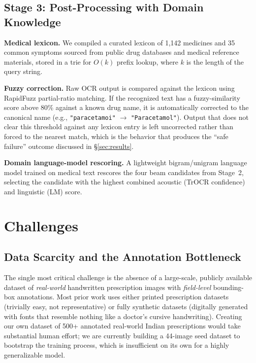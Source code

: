 \documentclass[conference]{IEEEtran}
\begin{document}
\subsection{Stage 3: Post-Processing with Domain Knowledge}
\label{sec:stage3}

\textbf{Medical lexicon.} We compiled a curated lexicon of 1{,}142 medicines and 35 common symptoms sourced from public drug databases and medical reference materials, stored in a trie for $O(k)$ prefix lookup, where $k$ is the length of the query string.

\textbf{Fuzzy correction.} Raw OCR output is compared against the lexicon using RapidFuzz partial-ratio matching. If the recognized text has a fuzzy-similarity score above 80\% against a known drug name, it is automatically corrected to the canonical name (e.g., \texttt{"paracetamoi"} $\to$ \texttt{"Paracetamol"}). Output that does not clear this threshold against any lexicon entry is left uncorrected rather than forced to the nearest match, which is the behavior that produces the ``safe failure'' outcome discussed in \S\ref{sec:results}.

\textbf{Domain language-model rescoring.} A lightweight bigram/unigram language model trained on medical text rescores the four beam candidates from Stage~2, selecting the candidate with the highest combined acoustic (TrOCR confidence) and linguistic (LM) score.

\section{Challenges}
\label{sec:challenges}

\subsection{Data Scarcity and the Annotation Bottleneck}

The single most critical challenge is the absence of a large-scale, publicly available dataset of \emph{real-world} handwritten prescription images with \emph{field-level} bounding-box annotations. Most prior work uses either printed prescription datasets (trivially easy, not representative) or fully synthetic datasets (digitally generated with fonts that resemble nothing like a doctor's cursive handwriting). Creating our own dataset of 500+ annotated real-world Indian prescriptions would take substantial human effort; we are currently building a 44-image seed dataset to bootstrap the training process, which is insufficient on its own for a highly generalizable model.
\end{document}
